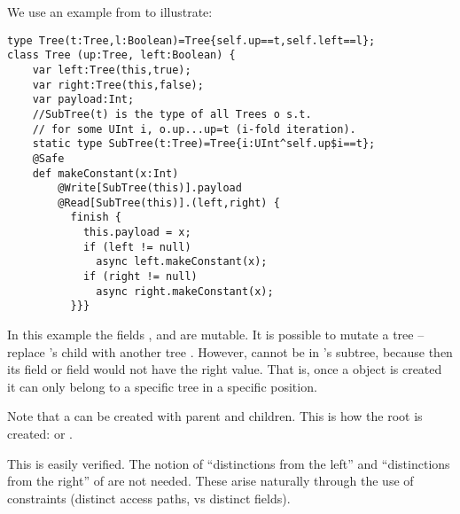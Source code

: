


We use an example from \cite{DPJ} to illustrate:
  \begin{lstlisting}
type Tree(t:Tree,l:Boolean)=Tree{self.up==t,self.left==l};
class Tree (up:Tree, left:Boolean) {
    var left:Tree(this,true);
    var right:Tree(this,false);
    var payload:Int;
    //SubTree(t) is the type of all Trees o s.t. 
    // for some UInt i, o.up...up=t (i-fold iteration).
    static type SubTree(t:Tree)=Tree{i:UInt^self.up$i==t};
    @Safe
    def makeConstant(x:Int)
        @Write[SubTree(this)].payload
        @Read[SubTree(this)].(left,right) {
          finish {
            this.payload = x; 
            if (left != null)
              async left.makeConstant(x); 
            if (right != null) 
              async right.makeConstant(x); 
          }}}
  \end{lstlisting}
In this example the fields , and 
are mutable. It is possible to mutate a tree  -- replace
's  child with another tree . However,  cannot be in
's  subtree, because then its  field or
 field would not have the right value. That is, once a
 object is created it can only belong to a specific tree in
a specific position.

Note that a  can be created with  parent and
children. This is how the root is created:
 or .

This is easily verified.
The notion of ``distinctions from the left'' and ``distinctions from
the right'' of \cite{DPJ} are not needed. These arise naturally
through the use of constraints (distinct access paths, vs distinct fields).


